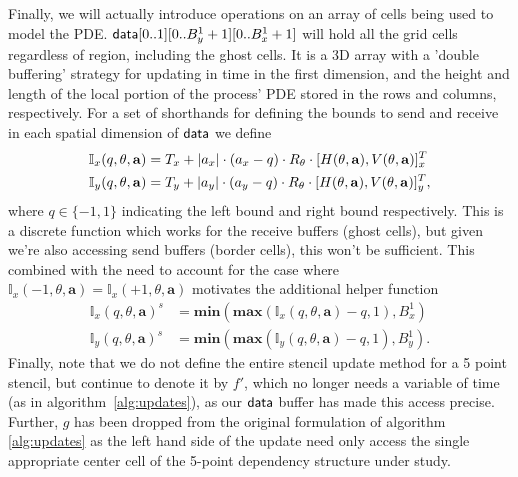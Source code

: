 Finally, we will actually introduce operations on an array of cells being used
to model the PDE.  $\textup{\textsf{data}}[0..1][0..B_y^1+1][0..B_x^1+1]$ will
hold all the grid cells regardless of region, including the ghost cells.  It
is a 3D array with a 'double buffering' strategy for updating in time
in the first dimension, and the height and length of the local portion
of the process' PDE stored in the rows and columns, respectively.  For
 a set of shorthands for defining the bounds to send and receive in
 each spatial dimension of $\textup{\textsf{data}}$ we define
\begin{eqnarray}
    \mathbb{I}_x(q, \theta,\mathbf{a}) &= T_x + |a_x|\cdot (a_x - q) \cdot R_{\theta} \cdot [H(\theta,\mathbf{a}),V(\theta,\mathbf{a})]^T_x\\
    \mathbb{I}_y(q, \theta,\mathbf{a}) &= T_y + |a_y|\cdot (a_y - q) \cdot R_{\theta} \cdot [H(\theta,\mathbf{a}),V(\theta,\mathbf{a})]^T_y,
\end{eqnarray}
where $q\in \{-1, 1\}$ indicating the left bound and right bound respectively.
This is a discrete function which works for the receive buffers (ghost cells), but given
we're also accessing send buffers (border cells), this won't be sufficient.
This combined with the need to account for the case where
$\mathbb{I}_x(-1,\theta,\mathbf{a}) = \mathbb{I}_x(+1,\theta,\mathbf{a})$ motivates
the additional helper function
\begin{eqnarray}
    \mathbb{I}_x(q,\theta,\mathbf{a})^s &= \textbf{min}(\textbf{max}(\mathbb{I}_x(q,\theta,\mathbf{a})-q,1),B_x^1)\\
    \mathbb{I}_y(q,\theta,\mathbf{a})^s &= \textbf{min}(\textbf{max}(\mathbb{I}_y(q,\theta,\mathbf{a})-q,1),B_y^1).
\end{eqnarray}
Finally, note that we do not define the entire stencil update
method for a 5 point stencil, but continue to denote it by
$f'$, which no longer needs a variable of time
(as in algorithm~\ref{alg:updates}), as our
$\textup{\textsf{data}}$ buffer has made this access precise.  Further,
$g$ has been dropped from the original formulation of
algorithm
\ref{alg:updates} as the left hand side of the update
need only access
the single appropriate center cell of the 5-point
dependency structure under study.